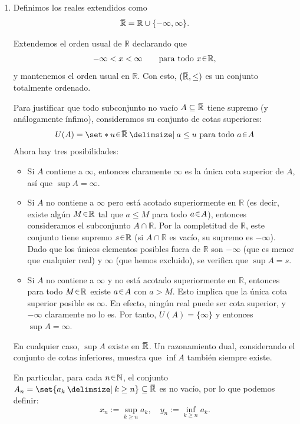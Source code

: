 \begin{sol}
\begin{enumerate}[label=(\roman*)]
\item %
Definimos los reales extendidos como
\[
\ubar{\mathbb{R}} = \mathbb{R} \cup \{-\infty, \infty\}.
\]

Extendemos el orden usual de $\mathbb{R}$ declarando que
\[
-\infty < x < \infty \qquad \text{para todo } x \en \mathbb{R},
\]
y mantenemos el orden usual en $\mathbb{R}$. Con esto,
$(\ubar{\mathbb{R}},\leq)$ es un conjunto totalmente ordenado.

Para justificar que todo subconjunto no vacío $A \subseteq \ubar{\mathbb{R}}$ tiene supremo (y análogamente ínfimo), consideramos su conjunto de cotas superiores:
\[
U(A) = \set*{ u \en \ubar{\mathbb{R}} \given a \leq u \text{ para todo } a \en A }
\]
Ahora hay tres posibilidades:
\begin{itemize}
    \item Si $A$ contiene a $\infty$, entonces claramente $\infty$ es la única cota superior de $A$, así que $\sup A = \infty$.
    
    \item Si $A$ no contiene a $\infty$ pero está acotado superiormente en $\mathbb{R}$ (es decir, existe algún $M \en \mathbb{R}$ tal que $a \leq M$ para todo $a \en A$), entonces consideramos el subconjunto $A \cap \mathbb{R}$. Por la completitud de $\mathbb{R}$, este conjunto tiene supremo $s \en \mathbb{R}$ (si $A \cap \mathbb{R}$ es vacío, su supremo es $-\infty$). Dado que los únicos elementos posibles fuera de $\mathbb{R}$ son $-\infty$ (que es menor que cualquier real) y $\infty$ (que hemos excluido), se verifica que $\sup A = s$.

    \item Si $A$ no contiene a $\infty$ y no está acotado superiormente en $\mathbb{R}$, entonces para todo $M \en \mathbb{R}$ existe $a \en A$ con $a > M$. Esto implica que la única cota superior posible es $\infty$. En efecto, ningún real puede ser cota superior, y $-\infty$ claramente no lo es. Por tanto, $U(A) = \{\infty\}$ y entonces $\sup A = \infty$.
\end{itemize}
En cualquier caso, $\sup A$ existe en $\ubar{\mathbb{R}}$. Un razonamiento dual, considerando el conjunto de cotas inferiores, muestra que $\inf A$ también siempre existe.

En particular, para cada $n \en \mathbb{N}$, el conjunto $A_n = \set{a_k \given k \ge n} \subseteq \ubar{\mathbb{R}}$ es no vacío, por lo que podemos definir:
\[
x_n := \sup_{k \ge n} a_k, \quad y_n := \inf_{k \ge n} a_k.
\]


\end{enumerate}
\end{sol}

